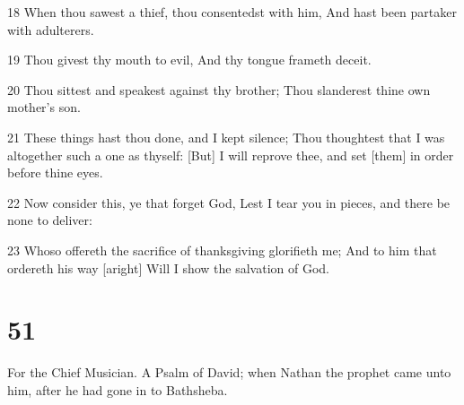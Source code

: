 \par 18 When thou sawest a thief, thou consentedst with him, And hast been partaker with adulterers.
\par 19 Thou givest thy mouth to evil, And thy tongue frameth deceit.
\par 20 Thou sittest and speakest against thy brother; Thou slanderest thine own mother's son.
\par 21 These things hast thou done, and I kept silence; Thou thoughtest that I was altogether such a one as thyself: [But] I will reprove thee, and set [them] in order before thine eyes.
\par 22 Now consider this, ye that forget God, Lest I tear you in pieces, and there be none to deliver:
\par 23 Whoso offereth the sacrifice of thanksgiving glorifieth me; And to him that ordereth his way [aright] Will I show the salvation of God.

\chapter{51}

\par For the Chief Musician. A Psalm of David; when Nathan the prophet came unto him, after he had gone in to Bathsheba.

